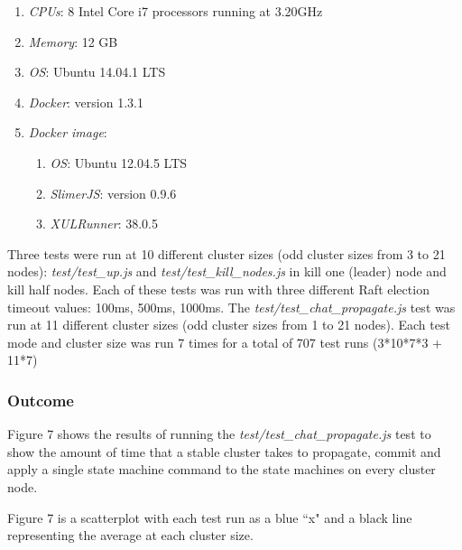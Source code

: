 \documentclass[9pt]{extarticle}
\begin{document}
\begin{multicols}{2}
\begin{enumerate}
    \item \emph{CPUs}: 8 Intel Core i7 processors running at 3.20GHz
    \item \emph{Memory}: 12 GB
    \item \emph{OS}: Ubuntu 14.04.1 LTS
    \item \emph{Docker}: version 1.3.1
    \item \emph{Docker image}:
    \begin{enumerate}
        \item \emph{OS}: Ubuntu 12.04.5 LTS
        \item \emph{SlimerJS}: version 0.9.6
        \item \emph{XULRunner}: 38.0.5
    \end{enumerate}
\end{enumerate}

Three tests were run at 10 different cluster sizes (odd cluster sizes
from 3 to 21 nodes): \emph{test/test\_up.js} and
\emph{test/test\_kill\_nodes.js} in kill one (leader) node and kill
half nodes. Each of these tests was run with three different Raft election
timeout values: 100ms, 500ms, 1000ms. The
\emph{test/test\_chat\_propagate.js} test was run at
11 different cluster sizes (odd cluster sizes from 1 to 21 nodes).
Each test mode and cluster size was run 7 times for a total of 707
test runs (3*10*7*3 + 11*7)

\subsubsection{Outcome}

Figure 7 shows the results of running the
\emph{test/test\_chat\_propagate.js} test to show the amount of time
that a stable cluster takes to propagate, commit and apply a single
state machine command to the state machines on every cluster node.

Figure 7 is a scatterplot with each test run as a blue ``x" and a black
line representing the average at each cluster size.

\begin{center}
\label{fig:propagate}
\end{center}


\end{multicols}
\end{document}
